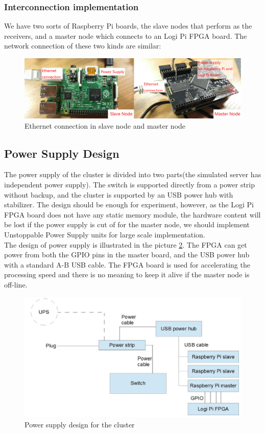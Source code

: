 \documentclass[11pt,openright,a4paper]{report}
\begin{document}
\subsubsection{Interconnection implementation}
We have two sorts of Raspberry Pi boards, the slave nodes that perform as the receivers, and a master node which connects to an Logi Pi FPGA board. The network connection of these two kinds are similar:
\begin{figure}[H]
\centering
\includegraphics[width=0.9\linewidth]{picture/photo/rappCluster}
\caption{Ethernet connection in slave node and master node}
\label{fig:rappCluster}
\end{figure}
\subsection{Power Supply Design}
The power supply of the cluster is divided into two parts(the simulated server has independent power supply). The switch is supported directly from a power strip without backup, and the cluster is supported by an USB power hub with stabilizer. The design should be enough for experiment, however, as the Logi Pi FPGA board does not have any static memory module, the hardware content will be lost if the power supply is cut of for the master node, we should implement Unstoppable Power Supply units for large scale implementation.\\
The design of power supply is illustrated in the picture \ref{fig:powerDesign}. The FPGA can get power from both the GPIO pins in the master board, and the USB power hub with a standard A-B USB cable. The FPGA board is used for accelerating the processing speed and there is no meaning to keep it alive if the master node is off-line.\\
\begin{figure}[H]
\centering
\includegraphics[width=0.7\linewidth]{picture/powerDesign}
\caption{Power supply design for the cluster}
\label{fig:powerDesign}
\end{figure}
\end{document}
